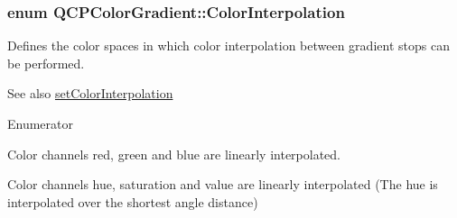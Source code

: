 \subsubsection[{\texorpdfstring{Color\+Interpolation}{ColorInterpolation}}]{\setlength{\rightskip}{0pt plus 5cm}enum {\bf Q\+C\+P\+Color\+Gradient\+::\+Color\+Interpolation}}\hypertarget{classQCPColorGradient_ac5dca17cc24336e6ca176610e7f77fc1}{}\label{classQCPColorGradient_ac5dca17cc24336e6ca176610e7f77fc1}
Defines the color spaces in which color interpolation between gradient stops can be performed.

\begin{DoxySeeAlso}{See also}
\hyperlink{classQCPColorGradient_aa13fda86406e1d896a465a409ae63b38}{set\+Color\+Interpolation} 
\end{DoxySeeAlso}
\begin{Desc}
\item[Enumerator]\par
\begin{description}
\item[{\em 
ci\+R\+GB\hypertarget{classQCPColorGradient_ac5dca17cc24336e6ca176610e7f77fc1a5e30f725c9cfe93999e268a9f92afbe7}{}\label{classQCPColorGradient_ac5dca17cc24336e6ca176610e7f77fc1a5e30f725c9cfe93999e268a9f92afbe7}
}]Color channels red, green and blue are linearly interpolated. \item[{\em 
ci\+H\+SV\hypertarget{classQCPColorGradient_ac5dca17cc24336e6ca176610e7f77fc1af14ae62fcae11ecc07234eeaec5856cb}{}\label{classQCPColorGradient_ac5dca17cc24336e6ca176610e7f77fc1af14ae62fcae11ecc07234eeaec5856cb}
}]Color channels hue, saturation and value are linearly interpolated (The hue is interpolated over the shortest angle distance) \end{description}
\end{Desc}
